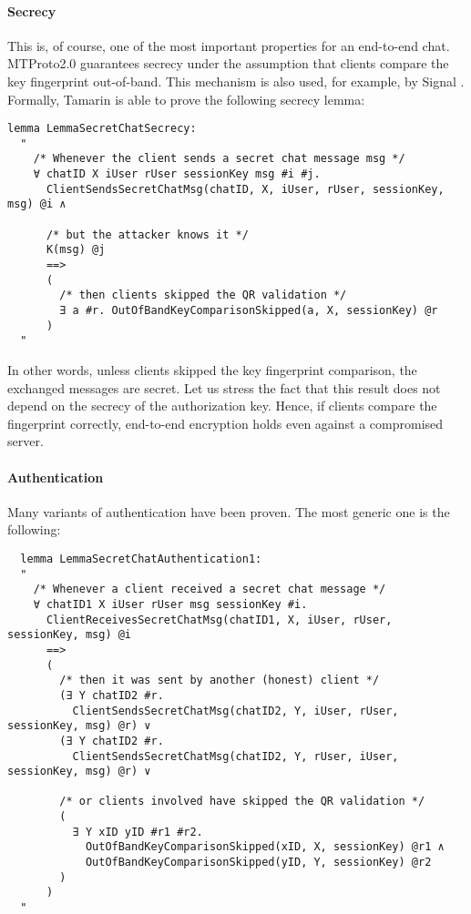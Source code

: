 \paragraph{Secrecy} This is, of course, one of the most important properties for an end-to-end chat. MTProto2.0 guarantees secrecy under the assumption that clients compare the \schat{} key fingerprint out-of-band. This mechanism is also used, for example, by Signal \cite{SignalProtocol}. Formally, Tamarin is able to prove the following secrecy lemma:

\begin{lstlisting}
lemma LemmaSecretChatSecrecy:
  "
    /* Whenever the client sends a secret chat message msg */
    ∀ chatID X iUser rUser sessionKey msg #i #j.
      ClientSendsSecretChatMsg(chatID, X, iUser, rUser, sessionKey, msg) @i ∧
      
      /* but the attacker knows it */
      K(msg) @j
      ==>
      (
        /* then clients skipped the QR validation */
        ∃ a #r. OutOfBandKeyComparisonSkipped(a, X, sessionKey) @r
      )
  "
\end{lstlisting}

In other words, unless clients skipped the key fingerprint comparison, the exchanged messages are secret. Let us stress the fact that this result does not depend on the secrecy of the authorization key. Hence, if clients compare the fingerprint correctly, end-to-end encryption holds even against a compromised server.

\paragraph{Authentication}
Many variants of authentication have been proven. The most generic one is the following:

\begin{lstlisting}
  lemma LemmaSecretChatAuthentication1:
  "
    /* Whenever a client received a secret chat message */
    ∀ chatID1 X iUser rUser msg sessionKey #i.
      ClientReceivesSecretChatMsg(chatID1, X, iUser, rUser, sessionKey, msg) @i
      ==>
      (
        /* then it was sent by another (honest) client */
        (∃ Y chatID2 #r. 
          ClientSendsSecretChatMsg(chatID2, Y, iUser, rUser, sessionKey, msg) @r) ∨
        (∃ Y chatID2 #r. 
          ClientSendsSecretChatMsg(chatID2, Y, rUser, iUser, sessionKey, msg) @r) ∨

        /* or clients involved have skipped the QR validation */
        (
          ∃ Y xID yID #r1 #r2. 
            OutOfBandKeyComparisonSkipped(xID, X, sessionKey) @r1 ∧
            OutOfBandKeyComparisonSkipped(yID, Y, sessionKey) @r2
        )
      )
  "
\end{lstlisting}

